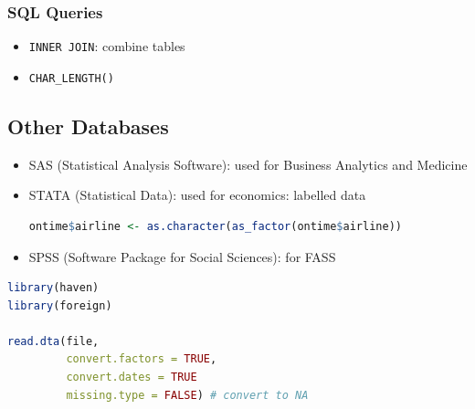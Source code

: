 \documentclass{article}
\begin{document}
\begin{multicols}{2}
\subsubsection{SQL Queries}
\begin{itemize}
	\item \texttt{INNER JOIN}: combine tables
	\item \texttt{CHAR\_LENGTH()}
\end{itemize}

\subsection{Other Databases}
\begin{itemize}
	\item SAS (Statistical Analysis Software): used for Business Analytics and Medicine
	\item STATA (Statistical Data): used for economics: labelled data
\begin{lstlisting}[language=R]
ontime$airline <- as.character(as_factor(ontime$airline))
\end{lstlisting}
	\item SPSS (Software Package for Social Sciences): for FASS
\end{itemize}
\begin{lstlisting}[language=R]
library(haven)
library(foreign)

read.dta(file,
         convert.factors = TRUE,
         convert.dates = TRUE
         missing.type = FALSE) # convert to NA
\end{lstlisting}


\end{multicols}
\end{document}
